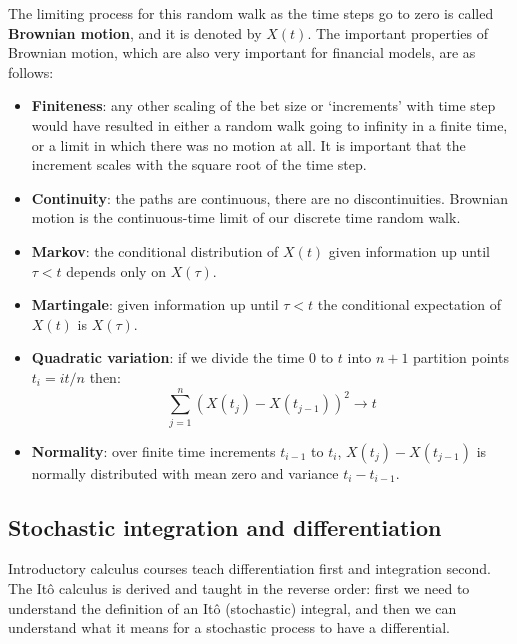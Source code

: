 The limiting process for this random walk as the time steps go to zero is called \textbf{Brownian motion}, and it is denoted by $X(t)$. The important properties of Brownian motion, which are also very important for financial models, are as follows:
\begin{itemize}
    \setlength\itemsep{0em}
    \item \textbf{Finiteness}: any other scaling of the bet size or `increments' with time step would have resulted in either a random walk going to infinity in a finite time, or a limit in which there was no motion at all. It is important that the increment scales with the square root of the time step.
    \item \textbf{Continuity}: the paths are continuous, there are no discontinuities. Brownian motion is the continuous-time limit of our discrete time random walk.
    \item \textbf{Markov}: the conditional distribution of $X(t)$ given information up until $\tau < t$ depends only on $X(\tau)$.
    \item \textbf{Martingale}: given information up until $\tau < t$ the conditional expectation of $X(t)$ is $X(\tau)$.
    \item \textbf{Quadratic variation}: if we divide the time 0 to $t$ into $n+1$ partition points $t_i = it/n$ then:
    \begin{equation}
        \sum_{j = 1}^n \left( X \left( t_j \right) - X \left( t_{j-1} \right) \right)^2 \rightarrow t
    \end{equation}
    \item \textbf{Normality}: over finite time increments $t_{i-1}$ to $t_i$, $X \left( t_j \right) - X \left( t_{j-1} \right)$ is normally distributed with mean zero and variance $t_i - t_{i-1}$.
\end{itemize}


\subsection{Stochastic integration and differentiation}
Introductory calculus courses teach differentiation first and integration second. The Itô calculus is derived and taught in the reverse order:
first we need to understand the definition of an Itô (stochastic) integral, and then we can understand what it means for a stochastic process to have a differential.

